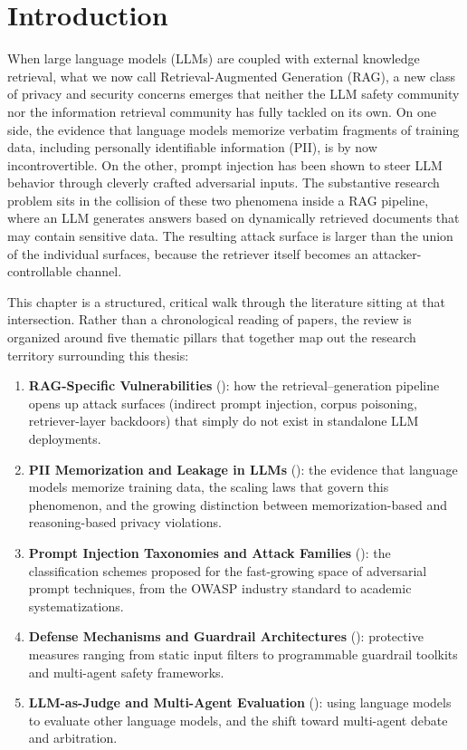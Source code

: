 \documentclass[12pt, a4paper]{article}
\begin{document}
\section*{Introduction}
{}
\label{sec:soa-intro}

When large language models (LLMs) are coupled with external knowledge retrieval, what we now call Retrieval-Augmented Generation (RAG), a new class of privacy and security concerns emerges that neither the LLM safety community nor the information retrieval community has fully tackled on its own. On one side, the evidence that language models memorize verbatim fragments of training data, including personally identifiable information (PII), is by now incontrovertible. On the other, prompt injection has been shown to steer LLM behavior through cleverly crafted adversarial inputs. The substantive research problem sits in the collision of these two phenomena inside a RAG pipeline, where an LLM generates answers based on dynamically retrieved documents that may contain sensitive data. The resulting attack surface is larger than the union of the individual surfaces, because the retriever itself becomes an attacker-controllable channel.

This chapter is a structured, critical walk through the literature sitting at that intersection. Rather than a chronological reading of papers, the review is organized around five thematic pillars that together map out the research territory surrounding this thesis:

\begin{enumerate}[leftmargin=2em, itemsep=3pt]
  \item \textbf{RAG-Specific Vulnerabilities} (): how the retrieval--generation pipeline opens up attack surfaces (indirect prompt injection, corpus poisoning, retriever-layer backdoors) that simply do not exist in standalone LLM deployments.
  \item \textbf{PII Memorization and Leakage in LLMs} (): the evidence that language models memorize training data, the scaling laws that govern this phenomenon, and the growing distinction between memorization-based and reasoning-based privacy violations.
  \item \textbf{Prompt Injection Taxonomies and Attack Families} (): the classification schemes proposed for the fast-growing space of adversarial prompt techniques, from the OWASP industry standard to academic systematizations.
  \item \textbf{Defense Mechanisms and Guardrail Architectures} (): protective measures ranging from static input filters to programmable guardrail toolkits and multi-agent safety frameworks.
  \item \textbf{LLM-as-Judge and Multi-Agent Evaluation} (): using language models to evaluate other language models, and the shift toward multi-agent debate and arbitration.
\end{enumerate}
\end{document}
